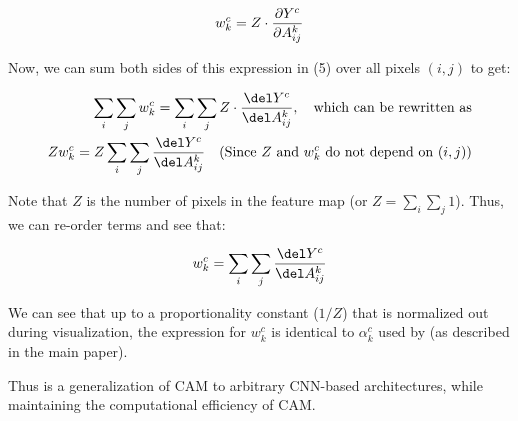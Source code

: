 \begin{equation}\label{eq:cam_weights}
    w_{k}^c = Z \cdot \frac{\partial Y^c}{\partial A_{ij}^k}\\
\end{equation}

Now, we can sum both sides of this expression in (5) over all pixels $(i,j)$ to get: 

\begin{align}
    \sum_i \sum_j w^c_k  = \sum_i \sum_j Z \cdot \frac{\del Y^c}{\del A^k_{ij} }, \quad \text{which can be rewritten as} \\ 
    Z w^c_k  = Z \sum_i \sum_j \frac{\del Y^c}{\del A^k_{ij} } \quad \text{(Since $Z$ and $w^c_k$ do not depend on $(i,j)$)}
\end{align}

Note that $Z$ is the number of pixels in the feature map (or $Z = \sum_i \sum_j 1 $). 
Thus, we can re-order terms and see that:

\begin{align}
    w^c_k  &= \sum_i \sum_j \frac{\del Y^c}{\del A^k_{ij} }\\
\end{align}

We can see that up to a proportionality constant ($1/Z$) that is normalized out during visualization, the expression for $w^c_k$ is identical to $\alpha^c_k$ used by \gcam{} (as described in the main paper). 


Thus \gcam{} is a generalization of CAM to arbitrary CNN-based architectures, while maintaining the computational efficiency of CAM.

